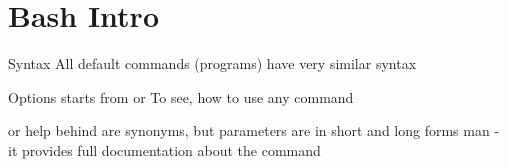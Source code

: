 \documentclass[usenames,dvipsnames,10pt,aspectratio=169]{beamer}
\begin{document}
\section{Bash Intro}

\begin{frame}{Syntax}
    All default commands (programs) have very similar syntax
    \begin{examples}
    \end{examples}
    Options starts from \ex{-} or \ex{-{}-} \newline
    To see, how to use any command
    \begin{examples}
         \newline or
        help \newline behind are synonyms, but parameters are in short and long forms \newline
        man   - it provides full documentation about the command
    \end{examples}
\end{frame}
\end{document}
